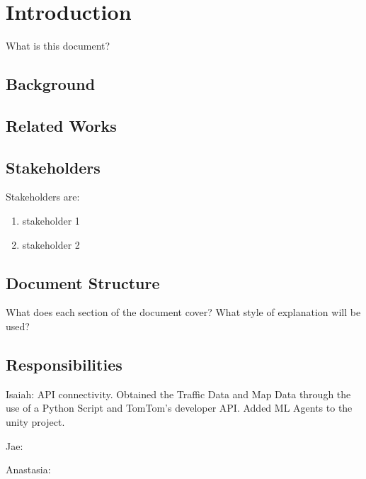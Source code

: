 \section{Introduction}

What is this document?

\subsection{Background}

\subsection{Related Works}

\subsection{Stakeholders}

Stakeholders are: 
\begin{enumerate}
    \item stakeholder 1
    \item stakeholder 2
\end{enumerate}

\subsection{Document Structure}

What does each section of the document cover?
What style of explanation will be used?

\subsection{Responsibilities}

Isaiah: API connectivity.
Obtained the Traffic Data and Map Data through the use of a Python Script and TomTom's developer API.
Added ML Agents to the unity project.

Jae: 

Anastasia: 